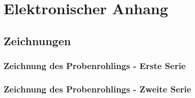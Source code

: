 \section{Elektronischer Anhang}

\subsection{Zeichnungen}
  \label{Zeichnungen}

  \subsubsection{Zeichnung des Probenrohlings - Erste Serie}

  \subsubsection{Zeichnung des Probenrohlings - Zweite Serie}
